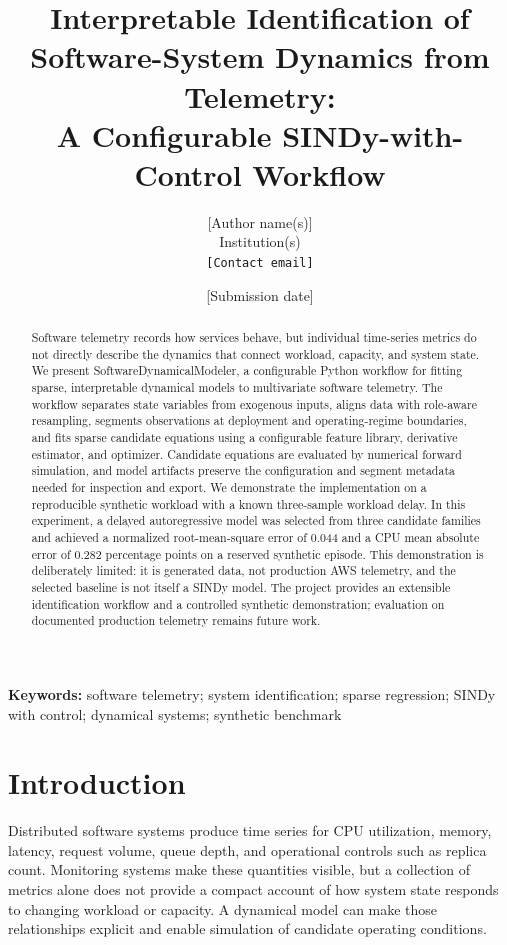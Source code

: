 \documentclass[11pt]{article}
\title{Interpretable Identification of Software-System Dynamics from Telemetry:\\
 A Configurable SINDy-with-Control Workflow}
\author{[Author name(s)]\\Institution(s)\\\texttt{[Contact email]}}
\date{[Submission date]}
\begin{document}
\maketitle

\begin{abstract}
Software telemetry records how services behave, but individual time-series metrics do not directly describe the dynamics that connect workload, capacity, and system state. We present SoftwareDynamicalModeler, a configurable Python workflow for fitting sparse, interpretable dynamical models to multivariate software telemetry. The workflow separates state variables from exogenous inputs, aligns data with role-aware resampling, segments observations at deployment and operating-regime boundaries, and fits sparse candidate equations using a configurable feature library, derivative estimator, and optimizer. Candidate equations are evaluated by numerical forward simulation, and model artifacts preserve the configuration and segment metadata needed for inspection and export. We demonstrate the implementation on a reproducible synthetic workload with a known three-sample workload delay. In this experiment, a delayed autoregressive model was selected from three candidate families and achieved a normalized root-mean-square error of 0.044 and a CPU mean absolute error of 0.282 percentage points on a reserved synthetic episode. This demonstration is deliberately limited: it is generated data, not production AWS telemetry, and the selected baseline is not itself a SINDy model. The project provides an extensible identification workflow and a controlled synthetic demonstration; evaluation on documented production telemetry remains future work.
\end{abstract}

\noindent\textbf{Keywords:} software telemetry; system identification; sparse regression; SINDy with control; dynamical systems; synthetic benchmark

\section{Introduction}

Distributed software systems produce time series for CPU utilization, memory, latency, request volume, queue depth, and operational controls such as replica count. Monitoring systems make these quantities visible, but a collection of metrics alone does not provide a compact account of how system state responds to changing workload or capacity. A dynamical model can make those relationships explicit and enable simulation of candidate operating conditions.
\end{document}
